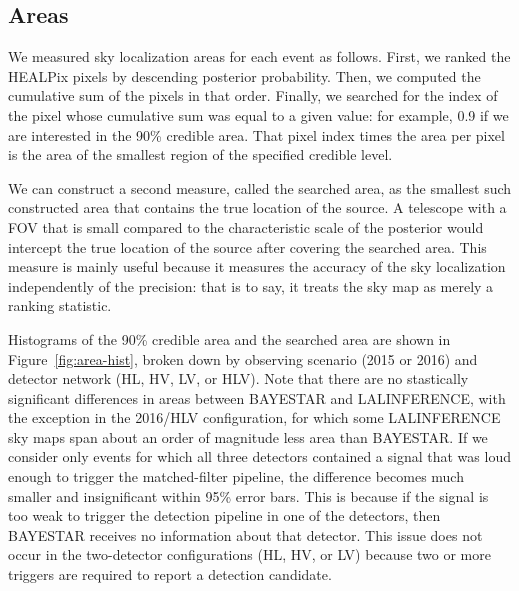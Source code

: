 \documentclass[amsmath,amssymb,aps,prx,reprint,nopreprintnumbers,nofootinbib]{revtex4-1}
\begin{document}
\subsection{Areas}

We measured sky localization areas for each event as follows. First, we ranked the \ac{HEALPix} pixels by descending posterior probability. Then, we computed the cumulative sum of the pixels in that order. Finally, we searched for the index of the pixel whose cumulative sum was equal to a given value: for example, 0.9 if we are interested in the 90\% credible area. That pixel index times the area per pixel is the area of the smallest region of the specified credible level.

We can construct a second measure, called the searched area, as the smallest such constructed area that contains the true location of the source. A telescope with a \ac{FOV} that is small compared to the characteristic scale of the posterior would intercept the true location of the source after covering the searched area. This measure is mainly useful because it measures the accuracy of the sky localization independently of the precision: that is to say, it treats the sky map as merely a ranking statistic.

Histograms of the 90\% credible area and the searched area are shown in Figure~\ref{fig:area-hist}, broken down by observing scenario (2015 or 2016) and detector network (HL, HV, LV, or HLV). Note that there are no stastically significant differences in areas between \ac{BAYESTAR} and LALINFERENCE, with the exception in the 2016/HLV configuration, for which some LALINFERENCE sky maps span about an order of magnitude less area than \ac{BAYESTAR}. If we consider only events for which all three detectors contained a signal that was loud enough to trigger the matched\nobreakdashes-filter pipeline, the difference becomes much smaller and insignificant within 95\% error bars. This is because if the signal is too weak to trigger the detection pipeline in one of the detectors, then \ac{BAYESTAR} receives no information about that detector. This issue does not occur in the two\nobreakdashes-detector configurations (HL, HV, or LV) because two or more triggers are required to report a detection candidate.
\end{document}
